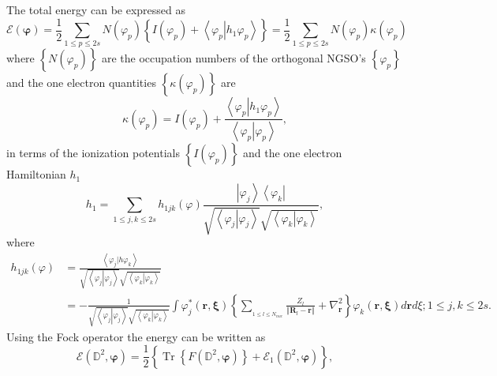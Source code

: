 \documentclass[aps,preprint]{revtex4}%
\begin{document}
The total energy can be expressed as
\begin{equation}
\mathcal{E}\left(  \mathbf{\varphi}\right)  =\frac{1}{2}\sum_{1\leq p\leq
2s}N\left(  \varphi_{p}\right)  \left\{  I\left(  \varphi_{p}\right)
+\left\langle \left.  \varphi_{p}\right\vert h_{1}\varphi_{p}\right\rangle
\right\}  =\frac{1}{2}%
{\textstyle\sum\limits_{1\leq p\leq2s}}
N\left(  \varphi_{p}\right)  \kappa\left(  \varphi_{p}\right)
\end{equation}
where $\left\{  N\left(  \varphi_{p}\right)  \right\}  $ are the occupation
numbers of the orthogonal NGSO's $\left\{  \varphi_{p}\right\}  $ and the one
electron quantities $\left\{  \kappa\left(  \varphi_{p}\right)  \right\}  $
are
\begin{equation}
\kappa\left(  \varphi_{p}\right)  =I\left(  \varphi_{p}\right)  +\frac
{\left\langle \left.  \varphi_{p}\right\vert h_{1}\varphi_{p}\right\rangle
}{\left\langle \left.  \varphi_{p}\right\vert \varphi_{p}\right\rangle },
\end{equation}
in terms of the ionization potentials $\left\{  I\left(  \varphi_{p}\right)
\right\}  $ and the one electron Hamiltonian $h_{1}$
\begin{equation}
h_{1}=\sum_{1\leq j,k\leq2s}h_{1jk}\left(  \varphi\right)  \frac{\left\vert
\varphi_{j}\right\rangle \left\langle \varphi_{k}\right\vert }{\sqrt
{\left\langle \left.  \varphi_{j}\right\vert \varphi_{j}\right\rangle }%
\sqrt{\left\langle \left.  \varphi_{k}\right\vert \varphi_{k}\right\rangle }},
\end{equation}
where
\begin{align}
h_{1jk}\left(  \varphi\right)   &  =\frac{\left\langle \varphi_{j}\left\vert
h\right.  \varphi_{k}\right\rangle }{\sqrt{\left\langle \left.  \varphi
_{j}\right\vert \varphi_{j}\right\rangle }\sqrt{\left\langle \left.
\varphi_{k}\right\vert \varphi_{k}\right\rangle }}\label{h1}\\
&  =-\frac{1}{\sqrt{\left\langle \left.  \varphi_{j}\right\vert \varphi
_{j}\right\rangle }\sqrt{\left\langle \left.  \varphi_{k}\right\vert
\varphi_{k}\right\rangle }}\int\varphi_{j}^{\ast}\left(  \mathbf{r,\xi
}\right)  \left\{  \sum_{_{1\leq l\leq N_{nuc}}}\frac{Z_{l}}{\left\Vert
\mathbf{R}_{l}-\mathbf{r}\right\Vert }+\nabla_{\mathbf{r}}^{2}\right\}
\varphi_{k}\left(  \mathbf{r,\xi}\right)  d\mathbf{r}d\xi;1\leq j,k\leq2s.
\end{align}
Using the Fock operator the energy can be written as
\begin{equation}
\mathcal{E}\left(  \mathbb{D}^{2},\mathbf{\varphi}\right)  =\frac{1}%
{2}\left\{  \overset{}{\operatorname{Tr}\left\{  F\left(  \mathbb{D}%
^{2},\mathbf{\varphi}\right)  \right\}  +\mathcal{E}_{1}\left(  \mathbb{D}%
^{2},\mathbf{\varphi}\right)  }\right\}  ,
\end{equation}
\end{document}
